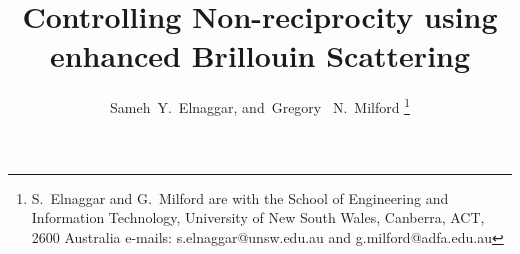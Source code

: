 \documentclass[journal]{IEEEtran}
\begin{document}
%
\title{Controlling Non-reciprocity using enhanced Brillouin Scattering}
%
%
%

\author{Sameh~Y.~Elnaggar,
         and~Gregory~ N.~Milford%
\thanks{S.~Elnaggar and G.~Milford are with the School of Engineering and Information Technology, University of New South Wales, Canberra, ACT, 2600 Australia  e-mails: s.elnaggar@unsw.edu.au and g.milford@adfa.edu.au}%
}

% 
%



% 
\end{document}
